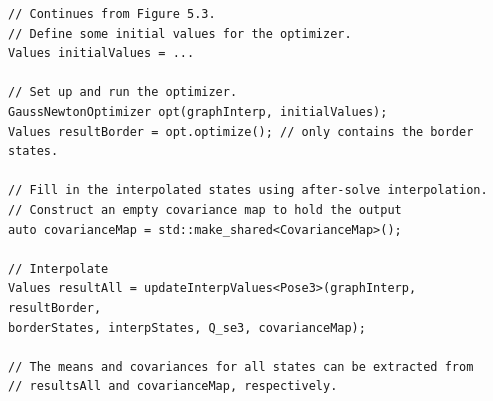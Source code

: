 \documentclass[border=1pt]{standalone}
\begin{document}
\begin{listingbox}
\begin{lstlisting}[style=C++Style, firstnumber=49]
// Continues from Figure 5.3.
// Define some initial values for the optimizer.
Values initialValues = ... 

// Set up and run the optimizer.
GaussNewtonOptimizer opt(graphInterp, initialValues);
Values resultBorder = opt.optimize(); // only contains the border states.

// Fill in the interpolated states using after-solve interpolation.
// Construct an empty covariance map to hold the output
auto covarianceMap = std::make_shared<CovarianceMap>();

// Interpolate
Values resultAll = updateInterpValues<Pose3>(graphInterp, resultBorder,
borderStates, interpStates, Q_se3, covarianceMap);

// The means and covariances for all states can be extracted from
// resultsAll and covarianceMap, respectively.
\end{lstlisting}
\end{listingbox}
\end{document}
